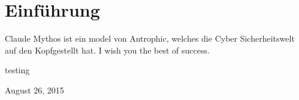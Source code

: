 \documentclass[conference]{IEEEtran}
\begin{document}




%
\IEEEpeerreviewmaketitle



\section{Einführung}
Claude Mythos ist ein model von Antrophic, welches die Cyber Sicherheitswelt auf den Kopfgestellt hat.
I wish you the best of success.

\hfill testing
 
\hfill August 26, 2015



%
%

\end{document}
